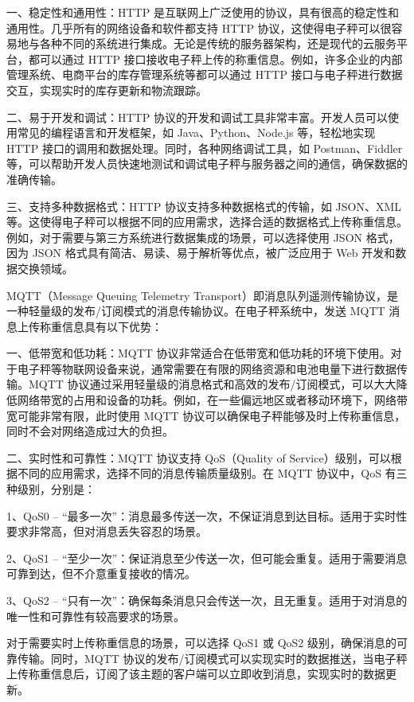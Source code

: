 一、稳定性和通用性：HTTP 是互联网上广泛使用的协议，具有很高的稳定性和通用性。几乎所有的网络设备和软件都支持 HTTP 协议，这使得电子秤可以很容易地与各种不同的系统进行集成。无论是传统的服务器架构，还是现代的云服务平台，都可以通过 HTTP 接口接收电子秤上传的称重信息。例如，许多企业的内部管理系统、电商平台的库存管理系统等都可以通过 HTTP 接口与电子秤进行数据交互，实现实时的库存更新和物流跟踪\cite{Zhao2016}。

二、易于开发和调试：HTTP 协议的开发和调试工具非常丰富。开发人员可以使用常见的编程语言和开发框架，如 Java、Python、Node.js 等，轻松地实现 HTTP 接口的调用和数据处理。同时，各种网络调试工具，如 Postman、Fiddler 等，可以帮助开发人员快速地测试和调试电子秤与服务器之间的通信，确保数据的准确传输。

三、支持多种数据格式：HTTP 协议支持多种数据格式的传输，如 JSON、XML 等。这使得电子秤可以根据不同的应用需求，选择合适的数据格式上传称重信息。例如，对于需要与第三方系统进行数据集成的场景，可以选择使用 JSON 格式，因为 JSON 格式具有简洁、易读、易于解析等优点，被广泛应用于 Web 开发和数据交换领域。

MQTT（Message Queuing Telemetry Transport）即消息队列遥测传输协议，是一种轻量级的发布/订阅模式的消息传输协议。在电子秤系统中，发送 MQTT 消息上传称重信息具有以下优势：

一、低带宽和低功耗：MQTT 协议非常适合在低带宽和低功耗的环境下使用。对于电子秤等物联网设备来说，通常需要在有限的网络资源和电池电量下进行数据传输。MQTT 协议通过采用轻量级的消息格式和高效的发布/订阅模式，可以大大降低网络带宽的占用和设备的功耗。例如，在一些偏远地区或者移动环境下，网络带宽可能非常有限，此时使用 MQTT 协议可以确保电子秤能够及时上传称重信息，同时不会对网络造成过大的负担\cite{Jia2015}。

二、实时性和可靠性：MQTT 协议支持 QoS（Quality of Service）级别，可以根据不同的应用需求，选择不同的消息传输质量级别。在 MQTT 协议中，QoS 有三种级别\cite{Jia2015}，分别是：

1、QoS0 – “最多一次”：消息最多传送一次，不保证消息到达目标。适用于实时性要求非常高，但对消息丢失容忍的场景。

2、QoS1 – “至少一次”：保证消息至少传送一次，但可能会重复。适用于需要消息可靠到达，但不介意重复接收的情况。

3、QoS2 – “只有一次”：确保每条消息只会传送一次，且无重复。适用于对消息的唯一性和可靠性有较高要求的场景。

对于需要实时上传称重信息的场景，可以选择 QoS1 或 QoS2 级别，确保消息的可靠传输。同时，MQTT 协议的发布/订阅模式可以实现实时的数据推送，当电子秤上传称重信息后，订阅了该主题的客户端可以立即收到消息，实现实时的数据更新。

